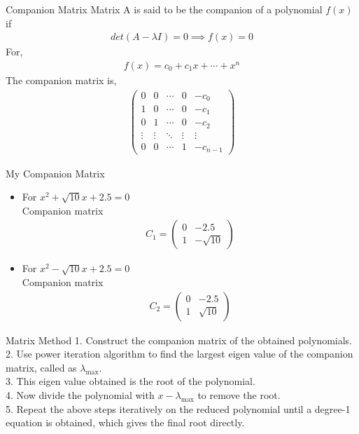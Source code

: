 \documentclass{beamer}
\providecommand{\brak}[1]{\ensuremath{\left(#1\right)}}
\theoremstyle{remark}
\newcommand{\myvec}[1]{\ensuremath{\begin{pmatrix}#1\end{pmatrix}}}
\numberwithin{equation}{section}
\begin{document}
\begin{frame}{Companion Matrix}
    Matrix A is said to be the companion of a polynomial $f\brak{x}$ if
    \begin{align}
        det\brak{A - \lambda I} = 0 \implies f\brak{x} = 0
    \end{align}
    For,
    \begin{align}
      f\brak{x} = c_0 + c_1 x + \cdots + x^n
    \end{align}
    The companion matrix is,
    \begin{align}
      \myvec{
        0 & 0 & \cdots & 0 & -c_0\\
        1 & 0 & \cdots & 0 & -c_1\\
        0 & 1 & \cdots & 0 & -c_2\\
        \vdots & \vdots & \ddots & \vdots & \vdots\\
        0 & 0 & \cdots & 1 & -c_{n-1}
      }
\end{align}
\end{frame}

\begin{frame}{My Companion Matrix}
    \begin{itemize}
        \item For $x^2 + \sqrt{10}x + 2.5 = 0$\\
        Companion matrix
        \begin{align}
            C_1 = \myvec{0 & -2.5 \\ 1 & -\sqrt{10}}
        \end{align}
        \item For $x^2 - \sqrt{10}x + 2.5 = 0$\\
        Companion matrix
        \begin{align}
            C_2 = \myvec{0 & -2.5 \\ 1 & \sqrt{10}}
        \end{align}
    \end{itemize}
\end{frame}

\begin{frame}{Matrix Method}
    1. Construct the companion matrix of the obtained polynomials.\\
    2. Use power iteration algorithm to find the largest eigen value of the companion matrix, called as $\lambda_{\text{max}}$.\\
    3. This eigen value obtained is the root of the polynomial.\\
    4. Now divide the polynomial with $x - \lambda_{\text{max}}$ to remove the root.\\
    5. Repeat the above steps iteratively on the reduced polynomial until a degree-1 equation is obtained, which gives the final root directly. \\
\end{frame}
\end{document}

